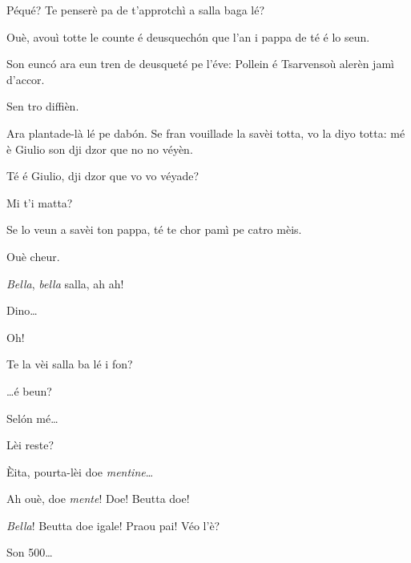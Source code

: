 \begin{drama}
\Vandaspeaks	Péqué? Te penserè pa de t’approtchì a salla baga lé?

\Ornellaspeaks	 Ouè, avouì totte le counte é deusquech\'on que l’an i pappa de té é lo seun.

\Vandaspeaks	Son eunc\'o ara eun tren de deusqueté pe l’éve: Pollein é Tsarvensoù alerèn jamì d’accor.

\Ornellaspeaks	 Sen tro diffièn.

\Vilmaspeaks Ara plantade-là lé pe dab\'on.  Se fran vouillade la savèi totta, vo la diyo totta: mé è Giulio son dji dzor que no no véyèn.

\Ornellaspeaks	 Té é Giulio, dji dzor que vo vo véyade?

\Vandaspeaks Mi t'i matta?

\Ornellaspeaks Se lo veun a savèi ton pappa, té te chor pamì pe catro mèis.

\Vandaspeaks Ouè cheur.


\Dinospeaks{} \textit{Bella}, \textit{bella} salla, ah ah!

\Genespeaks Dino\ldots

\Dinospeaks Oh!

\Genespeaks{} Te la vèi salla ba lé i fon?

\Dinospeaks \ldots é beun?

\Genespeaks Sel\'on mé\ldots

\Dinospeaks Lèi reste?


\Genespeaks \`Eita, pourta-lèi doe \textit{mentine}\ldots

\Dinospeaks Ah ouè, doe \textit{mente}! Doe! Beutta doe!


\Dinospeaks{} \textit{Bella}!  Beutta doe igale! Praou pai! Véo l'è?

\Genespeaks Son 500\ldots



\end{drama}
